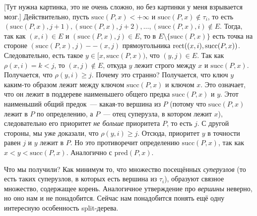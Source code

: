 [Тут нужна картинка, это не очень сложно, но без картинки у меня взрывается мозг.]
Действительно, пусть $\mathrm{succ}(P, x) < +\infty$ и $\mathrm{succ}(P, x) \notin \tau_i$, то есть $(\mathrm{succ}(P, x), j + 1), (\mathrm{succ}(P, x), j + 2), \ldots, (\mathrm{succ}(P, x), i) \notin E$. Тогда, так как $(x, i) \in E$ и $(\mathrm{succ}(P, x), j) \in E$, то в $E \setminus \{\mathrm{succ}(P, x)\}$ есть точка на стороне $(\mathrm{succ}(P, x), j)--(x,j)$ прямоугольника $\operatorname{rect}((x, i), \mathrm{succ}(P, x))$. Следовательно, есть такое $y \in [x, \mathrm{succ}(P, x))$, что $(y, j) \in E$. Так как $\rho(x, i) = k < j$, то $(x, j) \notin E$, откуда $y$ лежит строго между
$x$ и $\mathrm{succ}(P, x)$. Получается, что $\rho(y, i) \geqslant j$. Почему это странно? Получается, что ключ $y$ каким-то образом лежит между ключом $\mathrm{succ}(P, x)$ и ключом $x$. Это означает, что он лежит в поддереве наименьшего общего предка 
$\mathrm{succ}(P, x)$ и $y$. Этот наименьший общий предок~--- какая-то вершина из $P$ (потому что $\mathrm{succ}(P, x)$ лежит в $P$ по определению, а $P$~--- отец суперузла, в котором лежит $x$), следовательно его приоритет \emph{не больше} приоритета $P$, то есть $j$. С другой стороны, мы уже доказали, что $\rho(y, i) \geqslant j$. Отсюда, приоритет $y$ в точности равен $j$ и $y$ лежит в $P$. Но это противоречит определению $\mathrm{succ}(P, x)$, так как $x < y < \mathrm{succ}(P, x)$. Аналогично с $\mathrm{pred}(P, x)$.

Что мы получили? Как минимум то, что множество посещённых \emph{суперузлов} (то есть таких суперузлов, в которых есть вершина из $\tau_i$), образуют связное множество, содержащее корень. Аналогичное утверждение про \emph{вершины} неверно, но оно нам и не понадобится. Сейчас нам понадобится понять ещё одну интересную особенность split-дерева.

